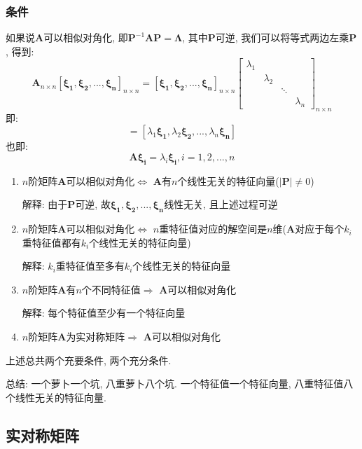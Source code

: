 \subsubsection{条件}
如果说$\bm{A}$可以相似对角化, 即$\bm{P}^{-1}\bm{A}\bm{P}=\bm{\Lambda}$, 其中$\bm{P}$可逆, 我们可以将等式两边左乘$\bm{P}$, 得到:
\begin{equation*}
\bm{A}_{n\times n}[\bm{\xi_{1}},\bm{\xi_{2}},...,\bm{\xi_{n}}]_{n \times n}=[\bm{\xi_{1}},\bm{\xi_{2}},...,\bm{\xi_{n}}]_{n\times n}
\begin{bmatrix}
\lambda_1 &  &  &  \\
& \lambda_2 &  &  \\
&  & \ddots &  \\
&  &  & \lambda_n
\end{bmatrix}_{n\times n}
\end{equation*}
即:
\begin{equation*}
[\bm{A}\bm{\xi_{1}},\bm{A}\bm{\xi_{2}},...,\bm{A}\bm{\xi_{n}}]=[\lambda_{1}\bm{\xi_{1}},\lambda_{2}\bm{\xi_{2}},...,\lambda_{n}\bm{\xi_{n}}]
\end{equation*}
也即:
\begin{equation*}
\bm{A}\bm{\xi_{i}}=\lambda_{i}\bm{\xi_{i}}, i=1,2,...,n
\end{equation*}
\begin{enumerate}
\item $ n $阶矩阵$ \bm{A} $可以相似对角化$ \Leftrightarrow $ $ \bm{A} $有$ n $个线性无关的特征向量($ \left| \bm{P}\right| \neq 0$)\par 解释: 由于$\bm{P}$可逆, 故$\bm{\xi_{1}},\bm{\xi_{2}},...,\bm{\xi_{n}}$线性无关, 且上述过程可逆
\item $ n $阶矩阵$ \bm{A} $可以相似对角化$ \Leftrightarrow $ $ n $重特征值对应的解空间是$ n $维($ \bm{A} $对应于每个$ k_i $重特征值都有$ k_i $个线性无关的特征向量)\par 解释: $k_{i}$重特征值至多有$k_{i}$个线性无关的特征向量
\item $ n $阶矩阵$ \bm{A} $有$ n $个不同特征值$ \Rightarrow $ $ \bm{A} $可以相似对角化 \par 解释: 每个特征值至少有一个特征向量
\item $ n $阶矩阵$ \bm{A} $为实对称矩阵$ \Rightarrow $ $ \bm{A} $可以相似对角化
\end{enumerate}\par
上述总共两个充要条件, 两个充分条件. \par 总结: 一个萝卜一个坑, 八重萝卜八个坑. 一个特征值一个特征向量, 八重特征值八个线性无关的特征向量.
\subsection{实对称矩阵}
